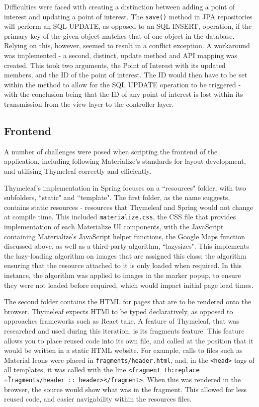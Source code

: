 Difficulties were faced with creating a distinction between adding a point of interest and updating a point of interest. The \texttt{save()} method in JPA repositories will perform an SQL UPDATE, as opposed to an SQL INSERT, operation, if the primary key of the given object matches that of one object in the database. Relying on this, however, seemed to result in a conflict exception. A workaround was implemented - a second, distinct, update method and API mapping was created. This took two arguments, the Point of Interest with its updated members, and the ID of the point of interest. The ID would then have to be set within the method to allow for the SQL UPDATE operation to be triggered - with the conclusion being that the ID of any point of interest is lost within its transmission from the view layer to the controller layer.

\subsection{Frontend}

A number of challenges were posed when scripting the frontend of the application, including following Materialize's standards for layout development, and utilising Thymeleaf correctly and efficiently.

Thymeleaf's implementation in Spring focuses on a ``resources" folder, with two subfolders, ``static" and ``template". The first folder, as the name suggests, contains static resources - resources that Thymeleaf and Spring would not change at compile time. This included \texttt{materialize.css}, the CSS file that provides implementation of each Materialize UI components, with the JavaScript containing Materialize's JavaScript helper functions, the Google Maps function discussed above, as well as a third-party algorithm, ``lazysizes"\cite{lazysizes}. This implements the lazy-loading algorithm on images that are assigned this class; the algorithm ensuring that the resource attached to it is only loaded when required. In this instance, the algorithm was applied to images in the marker popup, to ensure they were not loaded before required, which would impact initial page load times.

The second folder contains the HTML for pages that are to be rendered onto the browser. Thymeleaf expects HTMl to be typed declaratively, as opposed to approaches frameworks such as React take. A feature of Thymeleaf, that was researched and used during this iteration, is its fragments feature. This feature allows you to place reused code into its own file, and called at the position that it would be written in a static HTML website. For example, calls to files such as Material Icons were placed in \texttt{fragments/header.html}, and, in the \texttt{<head>} tags of all templates, it was called with the line \texttt{<fragment th:replace
=\"fragments/header :: header\"></fragment>}. When this was rendered in the browser, the source would show what was in the fragment. This allowed for less reused code, and easier navigability within the resources files.

